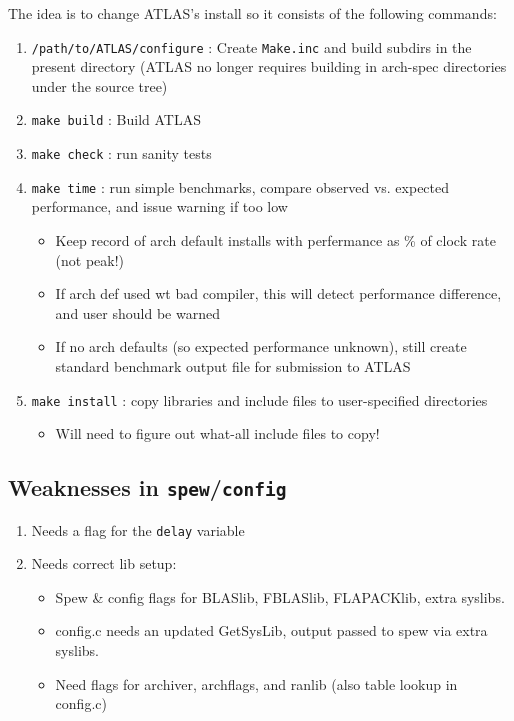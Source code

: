 \documentclass[11pt]{article}
\begin{document}
The idea is to change ATLAS's install so it consists of the following
commands:
\begin{enumerate}
\item {\tt /path/to/ATLAS/configure} : Create {\tt Make.inc} and build subdirs
      in the present directory (ATLAS no longer requires building in arch-spec
      directories under the source tree)
\item {\tt make build} : Build ATLAS
\item {\tt make check} : run sanity tests
\item {\tt make time} : run simple benchmarks, compare observed vs. expected
      performance, and issue warning if too low
   \begin{itemize}
   \item Keep record of arch default installs with perfermance as \% of
         clock rate (not peak!)
   \item If arch def used wt bad compiler, this will detect performance
         difference, and user should be warned
   \item If no arch defaults (so expected performance unknown), still create
         standard benchmark output file for submission to ATLAS
   \end{itemize}
\item {\tt make install} : copy libraries and include files to user-specified
      directories
   \begin{itemize}
   \item Will need to figure out what-all include files to copy!
   \end{itemize}
\end{enumerate}

\subsection{Weaknesses in {\tt spew}/{\tt config}}
\begin{enumerate}
\item Needs a flag for the {\tt delay} variable
\item Needs correct lib setup:
   \begin{itemize}
   \item Spew \& config flags for BLASlib, FBLASlib, FLAPACKlib, extra syslibs.
   \item config.c needs an updated GetSysLib, output passed to spew 
         via extra syslibs.
   \item Need flags for archiver, archflags, and ranlib 
         (also table lookup in config.c)
   \end{itemize}
\end{enumerate}
\end{document}
